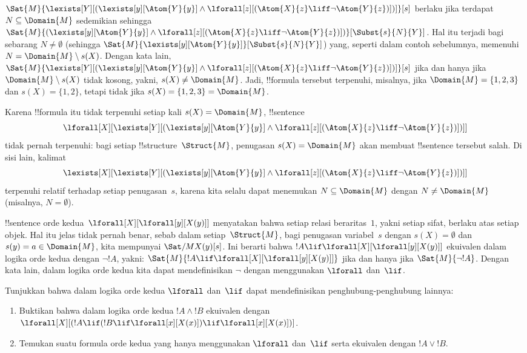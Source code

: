 \documentclass[../../../include/open-logic-section]{subfiles}
\begin{document}
\begin{ex}
  $\Sat{M}{\lexists[Y][(\lexists[y][\Atom{Y}{y}] \land
  \lforall[z][(\Atom{X}{z} \liff \lnot \Atom{Y}{z})])]}[s]$ berlaku jika
  terdapat $N \subseteq \Domain{M}$ sedemikian sehingga
  $\Sat{M}{(\lexists[y][\Atom{Y}{y}] \land \lforall[z][(\Atom{X}{z}
  \liff \lnot \Atom{Y}{z})])}[\Subst{s}{N}{Y}]$. Hal itu terjadi bagi
  sebarang $N \neq \emptyset$ (sehingga
  $\Sat{M}{\lexists[y][\Atom{Y}{y}]}[\Subst{s}{N}{Y}]$) yang, seperti dalam
  contoh sebelumnya, memenuhi $N = \Domain{M} \setminus s(X)$. Dengan kata
  lain,
  $\Sat{M}{\lexists[Y][(\lexists[y][\Atom{Y}{y}] \land
  \lforall[z][(\Atom{X}{z} \liff \lnot \Atom{Y}{z})])]}[s]$ jika dan hanya
  jika $\Domain{M} \setminus s(X)$ tidak kosong, yakni,
  $s(X) \neq \Domain{M}$. Jadi, !!{formula} tersebut terpenuhi, misalnya,
  jika $\Domain{M} = \{1, 2, 3\}$ dan $s(X) = \{1, 2\}$, tetapi tidak jika
  $s(X) = \{1, 2, 3\} = \Domain{M}$.

  Karena !!{formula} itu tidak terpenuhi setiap kali $s(X) = \Domain{M}$,
  !!{sentence}
  \[
  \lforall[X][\lexists[Y][(\lexists[y][\Atom{Y}{y}] \land
      \lforall[z][(\Atom{X}{z} \liff \lnot \Atom{Y}{z})])]]
  \]
  tidak pernah terpenuhi: bagi setiap !!{structure}~$\Struct{M}$, penugasan
  $s(X) = \Domain{M}$ akan membuat !!{sentence} tersebut salah. Di sisi lain,
  kalimat
  \[
  \lexists[X][\lexists[Y][(\lexists[y][\Atom{Y}{y}] \land
      \lforall[z][(\Atom{X}{z} \liff \lnot \Atom{Y}{z})])]]
  \]
  terpenuhi relatif terhadap setiap penugasan~$s$, karena kita selalu dapat
  menemukan $N \subseteq \Domain{M}$ dengan $N \neq \Domain{M}$ (misalnya,
  $N = \emptyset$).
\end{ex}

\begin{ex}
  !!{sentence} orde kedua~$\lforall[X][\lforall[y][X(y)]]$ menyatakan bahwa
  setiap relasi beraritas~$1$, yakni setiap sifat, berlaku atas setiap objek.
  Hal itu jelas tidak pernah benar, sebab dalam setiap~$\Struct{M}$, bagi
  penugasan variabel~$s$ dengan $s(X) = \emptyset$ dan
  $s(y) = a \in \Domain{M}$, kita mempunyai $\Sat/{M}{X(y)}[s]$. Ini berarti
  bahwa $!A \lif \lforall[X][\lforall[y][X(y)]]$ ekuivalen dalam logika orde
  kedua dengan $\lnot !A$, yakni: $\Sat{M}{!A \lif
  \lforall[X][\lforall[y][X(y)]]}$ jika dan hanya jika
  $\Sat{M}{\lnot !A}$. Dengan kata lain, dalam logika orde kedua kita dapat
  mendefinisikan $\lnot$ dengan menggunakan $\lforall$ dan~$\lif$.
\end{ex}

\begin{prob}
  Tunjukkan bahwa dalam logika orde kedua $\lforall$ dan~$\lif$ dapat
  mendefinisikan penghubung-penghubung lainnya:
  \begin{enumerate}
    \item Buktikan bahwa dalam logika orde kedua $!A \land !B$ ekuivalen
    dengan $\lforall[X][(!A \lif (!B \lif \lforall[x][X(x)])\lif
    \lforall[x][X(x)])]$.
    \item Temukan suatu formula orde kedua yang hanya menggunakan $\lforall$
    dan~$\lif$ serta ekuivalen dengan $!A \lor !B$.
  \end{enumerate}
\end{prob}
\end{document}
